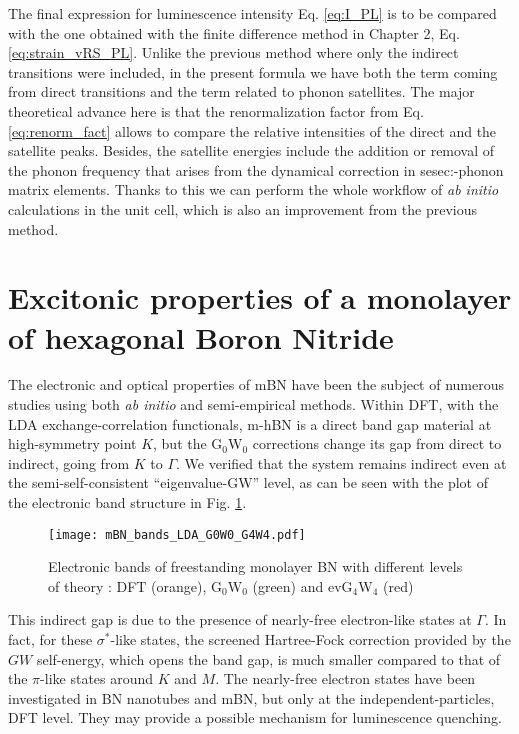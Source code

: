The final expression for luminescence intensity Eq. \eqref{eq:I_PL} is to be compared with the one obtained with the finite difference method in Chapter 2, Eq. \eqref{eq:strain_vRS_PL}. Unlike the previous method where only the indirect transitions were included, in the present formula we have both the term coming from direct transitions and the term related to phonon satellites. The major theoretical advance here is that the renormalization factor from Eq. \eqref{eq:renorm_fact} allows to compare the relative intensities of the direct and the satellite peaks. Besides, the satellite energies include the addition or removal of the phonon frequency that arises from the dynamical correction in sesec:-phonon matrix elements. Thanks to this we can perform the whole workflow of \textit{ab initio} calculations in the unit cell, which is also an improvement from the previous method. 


%
\section{Excitonic properties of a monolayer of hexagonal Boron Nitride}
The electronic and optical properties of \acrlong{mBN} have been the subject of numerous studies using both \emph{ab initio} and semi-empirical methods.\cite{galvani2016excitons}
Within DFT, with the LDA exchange-correlation functionals, m-hBN is a direct band gap material at high-symmetry point $K$, but the G$_0$W$_0$ corrections change its gap from direct to indirect, going from $K$ to $\Gamma$.\cite{prete2020giant} 
We verified that the system remains indirect even at the semi-self-consistent ``eigenvalue-GW'' level, as can be seen with the plot of the electronic band structure in Fig. \ref{fig:mBN_bands_LDA_G0W0_G4W4}.
\begin{figure}[h!b]
	\vspace{0.2cm}
	\setcapindent{2em}
	\centering
	\texttt{[image: mBN\_bands\_LDA\_G0W0\_G4W4.pdf]}
	\caption{Electronic bands of freestanding monolayer BN with different levels of theory : DFT (orange), G$_ 0$W$_0$ (green) and evG$_4$W$_4$ (red)} %
	\label{fig:mBN_bands_LDA_G0W0_G4W4}
\end{figure}
This indirect gap is due to the presence of nearly-free electron-like states at $\Gamma$. In fact, for these $\sigma^*$-like states, the screened Hartree-Fock correction provided by the $GW$ self-energy, which opens the band gap, is much smaller compared to that of the $\pi$-like states around $K$ and $M$.  The nearly-free electron states have been investigated in BN nanotubes and mBN,\cite{blase1994stability,Blase1995monolayer} but only at the independent-particles, \acrshort{DFT} level. They may provide a possible mechanism for luminescence quenching.

